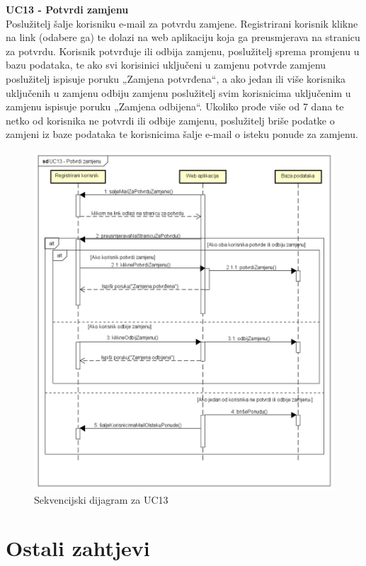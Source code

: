 \eject
	
		\textbf{UC13 - Potvrdi zamjenu}
		\textit\\
		Poslužitelj šalje korisniku e-mail za potvrdu zamjene. Registrirani korisnik klikne na link (odabere ga) te dolazi na web aplikaciju koja ga preusmjerava na stranicu za potvrdu. Korisnik potvrđuje ili odbija zamjenu, poslužitelj sprema promjenu u bazu podataka, te ako svi korisinici uključeni u zamjenu potvrde zamjenu poslužitelj ispisuje poruku „Zamjena potvrđena“, a ako jedan ili više korisnika uključenih u zamjenu odbiju zamjenu poslužitelj svim korisnicima uključenim u zamjenu ispisuje poruku „Zamjena odbijena“. Ukoliko prođe više od 7 dana te netko od korisnika ne potvrdi ili odbije zamjenu, poslužitelj briše podatke  o zamjeni iz baze podataka te korisnicima šalje e-mail o isteku ponude za zamjenu. 
		
	\begin{figure} [H]
		\includegraphics[width=.9\linewidth]{slike/UC13_sekvencijski_dijagram.PNG} 
		\centering
		\caption{Sekvencijski dijagram za UC13}
		\label{fig:sekvdij2}
	\end{figure}


\eject

\section{Ostali zahtjevi}


